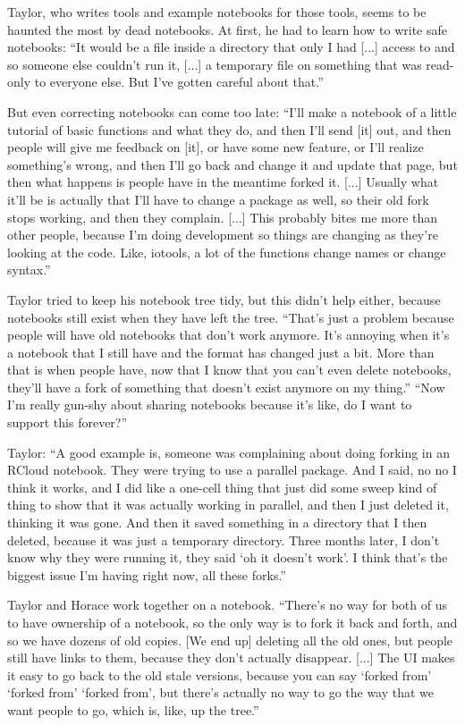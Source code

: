 Taylor, who writes tools and example notebooks for those tools, seems to be
haunted the most by dead notebooks.  At first, he had to learn how to write safe
notebooks: ``It would be a file inside a directory that only I had [...] access
to and so someone else couldn't run it, [...] a temporary file on something that
was read-only to everyone else. But I've gotten careful about that.''

But even correcting notebooks can come too late: ``I'll make a notebook of a
little tutorial of basic functions and what they do, and then I'll send [it]
out, and then people will give me feedback on [it], or have some new feature, or
I'll realize something's wrong, and then I'll go back and change it and update
that page, but then what happens is people have in the meantime forked it. [...]
Usually what it'll be is actually that I'll have to change a package as well, so
their old fork stops working, and then they complain. [...] This probably bites
me more than other people, because I'm doing development so things are changing
as they're looking at the code. Like, iotools, a lot of the functions change
names or change syntax.''

Taylor tried to keep his notebook tree tidy, but this didn't help either, because
notebooks still exist when they have left the tree. ``That's just a problem because people will have old notebooks that
don't work anymore. It's annoying when it's a notebook that I still have and the
format has changed just a bit. More than that is when people have, now that I
know that you can't even delete notebooks, they'll have a fork of something that
doesn't exist anymore on my thing.'' ``Now I'm really gun-shy about sharing
notebooks because it's like, do I want to support this forever?''

Taylor: ``A good example is, someone was complaining about doing forking in an
RCloud notebook. They were trying to use a parallel package. And I said, no no I
think it works, and I did like a one-cell thing that just did some sweep kind of
thing to show that it was actually working in parallel, and then I just deleted
it, thinking it was gone. And then it saved something in a directory that I then
deleted, because it was just a temporary directory. Three months later, I don't
know why they were running it, they said `oh it doesn't work'. I think that's
the biggest issue I'm having right now, all these forks.''

Taylor and Horace work together on a notebook. ``There's no way for both of us
to have ownership of a notebook, so the only way is to fork it back and forth,
and so we have dozens of old copies. [We end up] deleting all the old ones, but
people still have links to them, because they don't actually disappear. [...]
The UI makes it easy to go back to the old stale versions, because you can say
`forked from' `forked from' `forked from', but there's actually no way to go the
way that we want people to go, which is, like, up the tree.''

